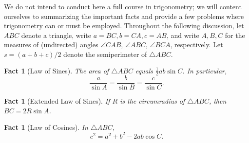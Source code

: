 \documentclass[12pt]{book}
\numberwithin{exc}{section}
\numberwithin{figure}{section}
\newtheorem{fact}[theorem]{Fact}
\numberwithin{equation}{theorem}
\def\ang{\angle}
\begin{document}
We do not intend to conduct here a full course in trigonometry; we will content ourselves to summarizing
the important facts and provide a few problems where trigonometry can 
or must be employed. Throughout the following discussion,
let $ABC$ denote a triangle, write $a = BC, b = CA, c = AB$, and write $A,B,C$ for the measures of (undirected) angles $\ang CAB$, $\ang ABC$, $\ang BCA$,
respectively. Let $s = (a+b+c)/2$ denote the semiperimeter  of $\triangle ABC$.

\begin{fact}[Law of Sines] 
The area of $\triangle ABC$ 
equals $\frac{1}{2} a b \sin C$. In 
particular,
\[
\frac{a}{\sin A} = \frac{b}{\sin B} = \frac{c}{\sin C}.
\]
\end{fact}

\begin{fact}[Extended Law of Sines] 
If $R$ is the circumradius of $\triangle ABC$, then $BC = 2R \sin A$.
\end{fact}

\begin{fact}[Law of Cosines] 
In $\triangle ABC$,
\[
c^{2} = a^{2} + b^{2} - 2 a b \cos C.
\]
\end{fact}
\end{document}
